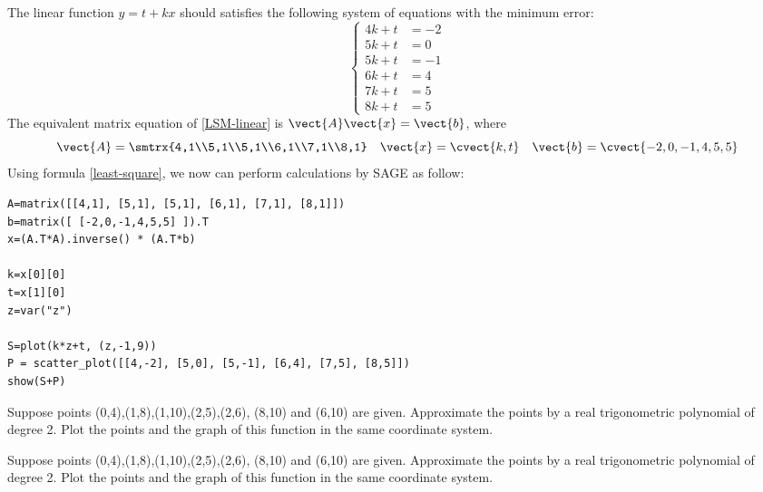 \begin{solution}
The linear function $y=t+kx$ should satisfies the following system of equations with the minimum error:
\begin{equation}
\label{LSM-linear}
\begin{cases}
4k+t &= -2 \\
5k+t &= 0 \\
5k+t &= -1 \\
6k+t &= 4 \\
7k+t &= 5 \\
8k+t &= 5 
\end{cases}
\end{equation}
The equivalent matrix equation of \eqref{LSM-linear} is $\vect{A}\vect{x}=\vect{b}$, where
\[ \vect{A}=\smtrx{4,1\\5,1\\5,1\\6,1\\7,1\\8,1} \quad \vect{x}=\cvect{k,t} \quad \vect{b}=\cvect{-2,0,-1,4,5,5} \]
Using formula \eqref{least-square}, we now can perform calculations by SAGE as follow:
\begin{verbatim}
A=matrix([[4,1], [5,1], [5,1], [6,1], [7,1], [8,1]])
b=matrix([ [-2,0,-1,4,5,5] ]).T
x=(A.T*A).inverse() * (A.T*b)

k=x[0][0]
t=x[1][0]
z=var("z")

S=plot(k*z+t, (z,-1,9))
P = scatter_plot([[4,-2], [5,0], [5,-1], [6,4], [7,5], [8,5]])
show(S+P)
\end{verbatim}
\end{solution}

\begin{exercise}
Suppose points (0,4),(1,8),(1,10),(2,5),(2,6), (8,10) and (6,10) are given. Approximate the points by a real trigonometric polynomial of degree 2. Plot the points and the
graph of this function in the same coordinate system. 
\end{exercise}

\begin{solution}
Suppose points (0,4),(1,8),(1,10),(2,5),(2,6), (8,10) and (6,10) are given. Approximate the points by a real trigonometric polynomial of degree 2. Plot the points and the
graph of this function in the same coordinate system. 
\end{solution}